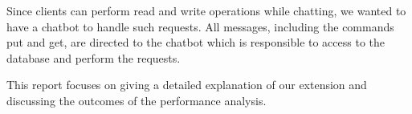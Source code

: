 Since clients can perform read and write operations while chatting, we wanted to have a chatbot to handle such requests. All messages, including the commands put and get, are directed to the chatbot which is responsible to access to the database and perform the requests.
 
This report focuses on giving a detailed explanation of our extension and discussing the outcomes of the performance analysis.

